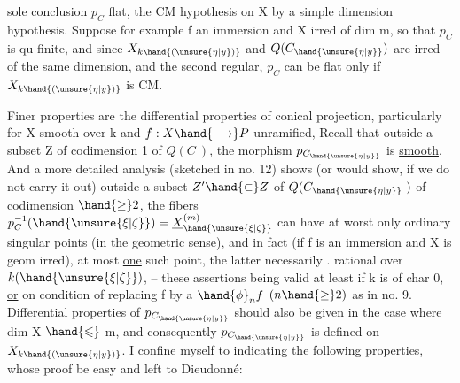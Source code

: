 sole conclusion $p_C$ flat, the CM hypothesis on X by a simple dimension
hypothesis. Suppose for example f an immersion and X irred of dim m,
so that $p_C$ is qu finite, and since $X_{k\hand{(\unsure{\eta|y})}}$ and $Q(C_{\hand{\unsure{\eta|y}}})$ are irred of
the same dimension,  and the second regular, $p_C$ can be
flat only if $X_{k\hand{(\unsure{\eta|y})}}$ is CM.

Finer properties are the differential properties of
conical projection, particularly for X smooth over k and $f:X\hand{\longrightarrow} P$ unramified,
  Recall that 
outside a subset Z of codimension 1 of $Q(C\ )$, the morphism
$p_{C_{\hand{\unsure{\eta|y}}}}$  is \uline{smooth}, And a more detailed analysis (sketched in no. 12) shows
(or would show, if we do not carry it out)   outside a subset $Z'\hand{\subset} Z$
of $Q(C_{\hand{\unsure{\eta|y}}}\ )$ of codimension $\hand{\geq} 2$, the fibers $p_C^{-1}(\hand{\unsure{\xi|\zeta}}) = \underline{X}^{(m)}_{\hand{\unsure{\xi|\zeta}}}$ can
have at worst only  ordinary singular points (in the geometric
sense), and in fact (if f is an immersion and X is geom irred),
 at most \uline{one} such point, the latter   necessarily  .
rational over $k(\hand{\unsure{\xi|\zeta}})$, -- these assertions being valid at least if
k is of char 0, \uline{or} on condition of replacing f by a $\hand{\phi}_n f$ $(n\hand{\geq} 2)$ as
in no. 9. Differential properties of
$p_{C_{\hand{\unsure{\eta|y}}}}$ should also be given in the case where dim X $\hand{\leqslant}$ m, and consequently $p_{C_{\hand{\unsure{\eta|y}}}}$ is defined on $X_{k\hand{(\unsure{\eta|y})}}$.
I confine myself to indicating the following properties, whose proof
 be easy and  left to Dieudonné:


